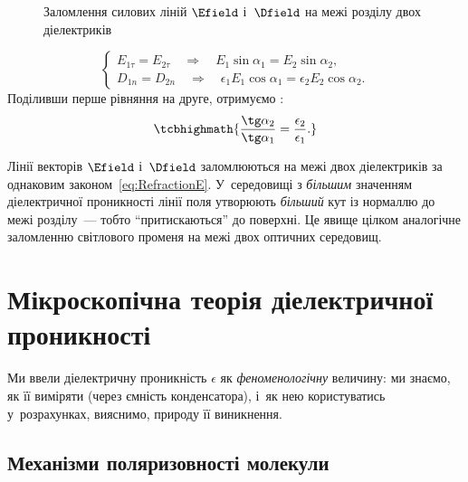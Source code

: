 \begin{figure}[h!]\centering
	\caption{Заломлення силових ліній $\Efield$ і~$\Dfield$ на межі розділу двох
		діелектриків\label{pic:RefractionE}}
\end{figure}
\begin{equation*}
	\begin{cases}
		E_{1\tau} = E_{2\tau} \quad\Longrightarrow\quad E_1\sin\alpha_1 = E_2\sin\alpha_2, \\
		D_{1n} = D_{2n} \quad\Longrightarrow\quad \epsilon_1 E_1\cos\alpha_1 = \epsilon_2 E_2\cos\alpha_2.
	\end{cases}
\end{equation*}
Поділивши перше рівняння на друге, отримуємо :
\begin{equation}\label{eq:RefractionE}
	\tcbhighmath{
		\frac{\tg\alpha_2}{\tg\alpha_1} = \frac{\epsilon_2}{\epsilon_1}.
	}
\end{equation}

\begin{Attention}
	Лінії векторів $\Efield$ і~$\Dfield$ заломлюються на межі двох діелектриків за
	однаковим законом~\eqref{eq:RefractionE}. У~середовищі з \emph{більшим} значенням
	діелектричної проникності лінії поля утворюють \emph{більший} кут із нормаллю до межі
	розділу~--- тобто \enquote{притискаються} до поверхні. Це явище цілком аналогічне
	заломленню світлового променя на межі двох оптичних середовищ.
\end{Attention}


\section{Мікроскопічна теорія діелектричної проникності}\hypertarget{microscopic-permittivity-theory}{}


Ми ввели діелектричну проникність $\epsilon$ як \emph{феноменологічну} величину: ми
знаємо, як її виміряти (через ємність конденсатора), і~як нею користуватись у~розрахунках,
вияснимо, природу її виникнення.


\subsection*{Механізми поляризовності молекули}\label{sec:AtomPolarizability}



